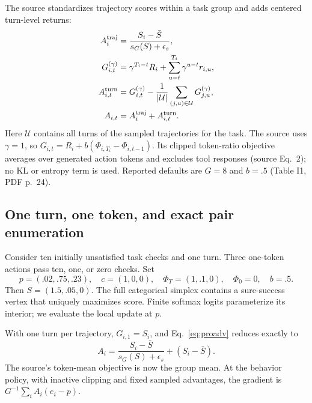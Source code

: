 \documentclass[11pt]{article}
\begin{document}
The source standardizes trajectory scores within a task group and adds centered turn-level returns:
\begin{align}
A_i^{\rm traj}&=\frac{S_i-\bar S}{s_G(S)+\epsilon_s},\nonumber\\
G_{i,t}^{(\gamma)}&=\gamma^{T_i-t}R_i+
 \sum_{u=t}^{T_i}\gamma^{u-t}r_{i,u},\nonumber\\
A_{i,t}^{\rm turn}&=G_{i,t}^{(\gamma)}-
 \frac1{|\mathcal U|}\sum_{(j,u)\in\mathcal U}G_{j,u}^{(\gamma)},\nonumber\\
A_{i,t}&=A_i^{\rm traj}+A_{i,t}^{\rm turn}.
\label{eq:proadv}
\end{align}
Here $\mathcal U$ contains all turns of the sampled trajectories for the task. The source uses $\gamma=1$, so
$G_{i,t}=R_i+b(\Phi_{i,T_i}-\Phi_{i,t-1})$.
Its clipped token-ratio objective averages over generated action tokens and excludes tool responses (source Eq.~2); no KL or entropy term is used. Reported defaults are $G=8$ and $b=.5$ (Table I1, PDF p.~24).

\subsection{One turn, one token, and exact pair enumeration}
Consider ten initially unsatisfied task checks and one turn. Three one-token actions pass ten, one, or zero checks. Set
\begin{equation}
p=(.02,.75,.23),\quad c=(1,0,0),\quad
\Phi_T=(1,.1,0),\quad\Phi_0=0,\quad b=.5.
\end{equation}
Then $S=(1.5,.05,0)$. The full categorical simplex contains a sure-success vertex that uniquely maximizes score. Finite softmax logits parameterize its interior; we evaluate the local update at $p$.

With one turn per trajectory, $G_{i,1}=S_i$, and Eq.~\eqref{eq:proadv} reduces exactly to
\begin{equation}
A_i=\frac{S_i-\bar S}{s_G(S)+\epsilon_s}+(S_i-\bar S).
\label{eq:proone}
\end{equation}
The source's token-mean objective is now the group mean. At the behavior policy, with inactive clipping and fixed sampled advantages, the gradient is $G^{-1}\sum_iA_i(e_i-p)$.
\end{document}
